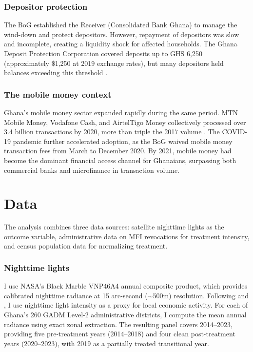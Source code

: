 \documentclass[12pt]{article}
\begin{document}
\subsubsection*{Depositor protection} The BoG established the Receiver (Consolidated Bank Ghana) to manage the wind-down and protect depositors. However, repayment of depositors was slow and incomplete, creating a liquidity shock for affected households. The Ghana Deposit Protection Corporation covered deposits up to GHS 6,250 (approximately \$1,250 at 2019 exchange rates), but many depositors held balances exceeding this threshold \citep{Appiah2020}.

\subsubsection*{The mobile money context} Ghana's mobile money sector expanded rapidly during the same period. MTN Mobile Money, Vodafone Cash, and AirtelTigo Money collectively processed over 3.4 billion transactions by 2020, more than triple the 2017 volume \citep{BoG2020}. The COVID-19 pandemic further accelerated adoption, as the BoG waived mobile money transaction fees from March to December 2020. By 2021, mobile money had become the dominant financial access channel for Ghanaians, surpassing both commercial banks and microfinance in transaction volume.

\section{Data}

The analysis combines three data sources: satellite nighttime lights as the outcome variable, administrative data on MFI revocations for treatment intensity, and census population data for normalizing treatment.

\subsubsection*{Nighttime lights} I use NASA's Black Marble VNP46A4 annual composite product, which provides calibrated nighttime radiance at 15 arc-second ($\sim$500m) resolution. Following \citet{Henderson2012} and \citet{Michalopoulos2013}, I use nighttime light intensity as a proxy for local economic activity. For each of Ghana's 260 GADM Level-2 administrative districts, I compute the mean annual radiance using exact zonal extraction. The resulting panel covers 2014--2023, providing five pre-treatment years (2014--2018) and four clean post-treatment years (2020--2023), with 2019 as a partially treated transitional year.
\end{document}
